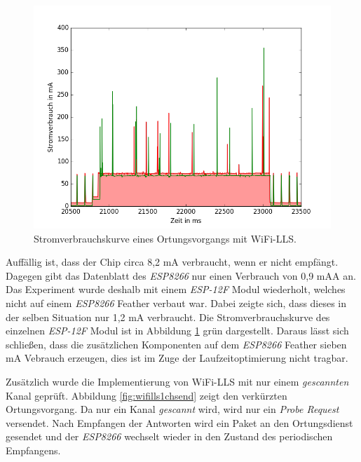 \begin{figure}[h!]
  \centering
	\includegraphics[width=\textwidth]{plots/wifillssendv.png}
  \caption{Stromverbrauchskurve eines Ortungsvorgangs mit WiFi-LLS.}
  \label{fig:wifillssendv}
\end{figure}

Auffällig ist, dass der Chip circa 8,2 mA verbraucht, wenn er nicht empfängt. 
Dagegen gibt das Datenblatt des \emph{ESP8266} nur einen Verbrauch von 0,9 mAA an.
Das Experiment wurde deshalb mit einem \emph{ESP-12F} Modul wiederholt, welches nicht auf einem \emph{ESP8266} Feather verbaut war. 
Dabei zeigte sich, dass dieses in der selben Situation nur 1,2 mA verbraucht.
Die Stromverbrauchskurve des einzelnen \emph{ESP-12F} Modul ist in Abbildung \ref{fig:wifillssendv} grün dargestellt.
Daraus lässt sich schließen, dass die zusätzlichen Komponenten auf dem \emph{ESP8266} Feather sieben mA Vebrauch erzeugen, dies ist im Zuge der Laufzeitoptimierung nicht tragbar.

Zusätzlich wurde die Implementierung von WiFi-LLS mit nur einem \emph{gescannten} Kanal geprüft.
Abbildung \ref{fig:wifills1chsend} zeigt den verkürzten Ortungsvorgang.
Da nur ein Kanal \emph{gescannt} wird, wird nur ein \emph{Probe Request} versendet.
Nach Empfangen der Antworten wird ein Paket an den Ortungsdienst gesendet und der \emph{ESP8266} wechselt wieder in den Zustand des periodischen Empfangens.

